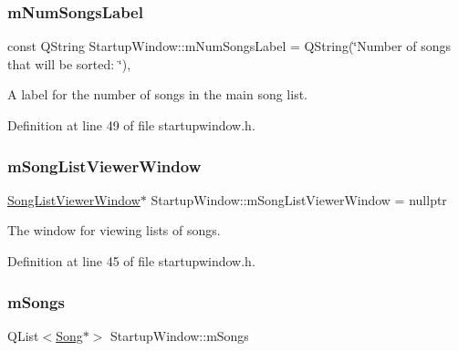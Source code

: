 \mbox{\label{class_startup_window_a59337faf9ce34917d0e056414601c571}} 
\subsubsection{\texorpdfstring{m\+Num\+Songs\+Label}{mNumSongsLabel}}
{\footnotesize\ttfamily const Q\+String Startup\+Window\+::m\+Num\+Songs\+Label = Q\+String(\char`\"{}Number of songs that will be sorted\+: \char`\"{})\hspace{0.3cm}{\ttfamily [static]}, {\ttfamily [private]}}



A label for the number of songs in the main song list. 



Definition at line 49 of file startupwindow.\+h.

\mbox{\label{class_startup_window_a26e72433e3cf3d35ae49d77d91f5cc38}} 
\subsubsection{\texorpdfstring{m\+Song\+List\+Viewer\+Window}{mSongListViewerWindow}}
{\footnotesize\ttfamily \mbox{\hyperlink{class_song_list_viewer_window}{Song\+List\+Viewer\+Window}}$\ast$ Startup\+Window\+::m\+Song\+List\+Viewer\+Window = nullptr\hspace{0.3cm}{\ttfamily [private]}}



The window for viewing lists of songs. 



Definition at line 45 of file startupwindow.\+h.

\mbox{\label{class_startup_window_ae57241505d74639131cb0ece2cfc922b}} 
\subsubsection{\texorpdfstring{m\+Songs}{mSongs}}
{\footnotesize\ttfamily Q\+List$<$\mbox{\hyperlink{class_song}{Song}}$\ast$$>$ Startup\+Window\+::m\+Songs\hspace{0.3cm}{\ttfamily [private]}}



